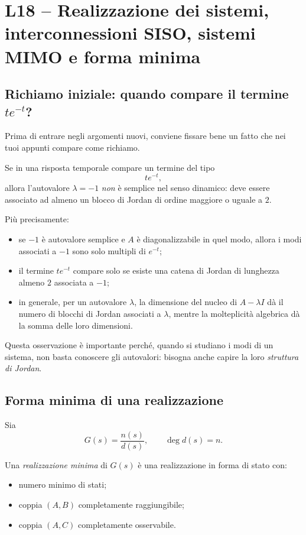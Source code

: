 \chapter{L18 -- Realizzazione dei sistemi, interconnessioni SISO, sistemi MIMO e forma minima}
\label{chap:L18}

\section{Richiamo iniziale: quando compare il termine \(t e^{-t}\)?}

Prima di entrare negli argomenti nuovi, conviene fissare bene un fatto che nei tuoi appunti compare come richiamo.

Se in una risposta temporale compare un termine del tipo
\[
t e^{-t},
\]
allora l'autovalore \(\lambda=-1\) \emph{non} è semplice nel senso dinamico: deve essere associato ad almeno un blocco di Jordan di ordine maggiore o uguale a \(2\).

Più precisamente:
\begin{itemize}
    \item se \(-1\) è autovalore semplice e \(A\) è diagonalizzabile in quel modo, allora i modi associati a \(-1\) sono solo multipli di \(e^{-t}\);
    \item il termine \(t e^{-t}\) compare solo se esiste una catena di Jordan di lunghezza almeno \(2\) associata a \(-1\);
    \item in generale, per un autovalore \(\lambda\), la dimensione del nucleo di \(A-\lambda I\) dà il numero di blocchi di Jordan associati a \(\lambda\), mentre la molteplicità algebrica dà la somma delle loro dimensioni.
\end{itemize}

Questa osservazione è importante perché, quando si studiano i modi di un sistema, non basta conoscere gli autovalori: bisogna anche capire la loro \emph{struttura di Jordan}.

\bigskip

\section{Forma minima di una realizzazione}

Sia
\[
G(s)=\frac{n(s)}{d(s)},
\qquad \deg d(s)=n.
\]

Una \emph{realizzazione minima} di \(G(s)\) è una realizzazione in forma di stato con:
\begin{itemize}
    \item numero minimo di stati;
    \item coppia \((A,B)\) completamente raggiungibile;
    \item coppia \((A,C)\) completamente osservabile.
\end{itemize}

